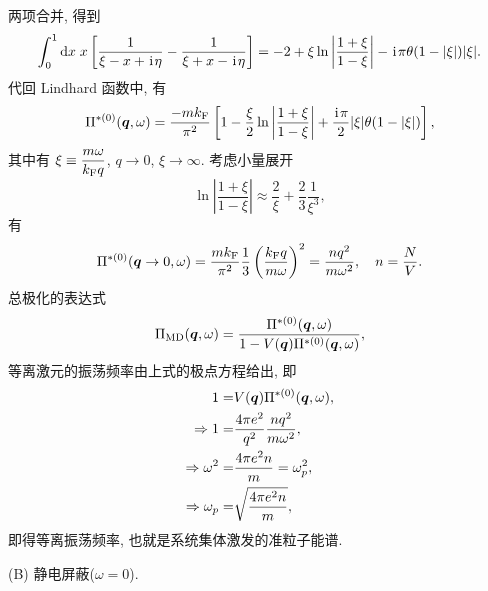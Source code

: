 两项合并, 得到 
\begin{equation}
    \int_0^1\mathrm{d} x\;x\left[ \frac{1}{\xi-x+\hspace{0.1em}\mathrm{i}\hspace{0.1em}\eta}-\frac{1}{\xi+x-\hspace{0.1em}\mathrm{i}\hspace{0.1em}\eta} \right]=-2+\xi\ln\left| \frac{1+\xi}{1-\xi} \right|-\hspace{0.1em}\mathrm{i}\hspace{0.1em}\pi\theta(1-|\xi|)|\xi|.
\end{equation}
代回 Lindhard 函数中, 有 
\begin{equation}
    \Pi^{*(0)}(\boldsymbol{q},\omega)=\frac{-mk_{\mathrm{F}}}{\pi^2}\left[ 1-\frac{\xi}{2}\ln\left| \frac{1+\xi}{1-\xi} \right|+\frac{\hspace{0.1em}\mathrm{i}\hspace{0.1em}\pi}{2}|\xi|\theta(1-|\xi|) \right],
\end{equation}
其中有 $\displaystyle \xi\equiv \frac{m\omega}{k_{\mathrm{F}}q}$, $q\to 0$, $\xi\to \infty$. 考虑小量展开 
\begin{equation}
    \ln\left| \frac{1+\xi}{1-\xi} \right|\approx \frac{2}{\xi}+\frac{2}{3}\frac{1}{\xi^3},
\end{equation}
有 
\begin{equation}
    \Pi^{*(0)}(\boldsymbol{q}\to 0,\omega)=\frac{mk_{\mathrm{F}}}{\pi^2}\frac{1}{3}\left( \frac{k_{\mathrm{F}}q}{m\omega} \right)^2=\frac{nq^2}{m\omega^2},\quad n=\frac{N}{V}.
\end{equation}
总极化的表达式 
\begin{equation}
    \Pi_{\mathrm{MD}}(\boldsymbol{q},\omega)=\frac{\Pi^{*(0)}(\boldsymbol{q},\omega)}{1-V(\boldsymbol{q})\Pi^{*(0)}(\boldsymbol{q},\omega)},
\end{equation}
等离激元的振荡频率由上式的极点方程给出, 即 
 \begin{align}
        1=&V(\boldsymbol{q})\Pi^{*(0)}(\boldsymbol{q},\omega),\nonumber\\
        \Rightarrow 1=&\frac{4\pi e^2}{q^2}\frac{nq^2}{m\omega^2},\nonumber\\
        \Rightarrow \omega^2=&\frac{4\pi e^2n}{m}= \omega_p^2,\nonumber\\
        \Rightarrow\omega_p=&\sqrt{\frac{4\pi e^2n}{m}},
    \end{align}
即得等离振荡频率, 也就是系统集体激发的准粒子能谱. 

(B) 静电屏蔽($\omega=0$).

